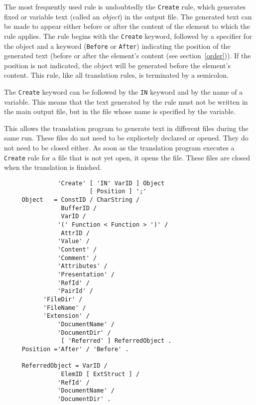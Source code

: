 The most frequently used rule is undoubtedly the {\tt Create} rule,
which generates fixed or variable text (called an {\em object}) in the
output file.  The generated text can be made to appear either
before or after the content of the element to which the rule applies.
The rule begins with the {\tt Create} keyword, followed by a specifier
for the object and a keyword ({\tt Before} or {\tt After}) indicating
the position of the generated text (before or after the element's
content (see section~\ref{order})).  If the position is not indicated,
the object will be generated before the element's content.  This rule,
like all translation rules, is terminated by a semicolon.

The {\tt Create} keyword can be followed by the {\tt IN} keyword and
by the name of a variable.  This means that the text generated by the
rule must not be written in the main output file, but in the file whose
name is specified by the variable.

This allows the translation program to generate text in different files
during the same run. These files do not need to be explicetely declared or
opened. They do not need to be closed either. As soon as the translation
program executes a {\tt Create} rule for a file that is not yet open,
it opens the file. These files are closed when the translation is finished.

\begin{verbatim}
               'Create' [ 'IN' VarID ] Object
                        [ Position ] ';'
     Object   = ConstID / CharString /
                BufferID /
                VarID /
               '(' Function < Function > ')' /
                AttrID /
               'Value' /
               'Content' /
               'Comment' / 
               'Attributes' /
               'Presentation' /
               'RefId' /
               'PairId' /
	       'FileDir' /
	       'FileName' /
	       'Extension' /
               'DocumentName' /
               'DocumentDir' /
                [ 'Referred' ] ReferredObject .
     Position ='After' / 'Before' .

     ReferredObject = VarID /
                ElemID [ ExtStruct ] /
               'RefId' /
               'DocumentName' /
               'DocumentDir' .
\end{verbatim}

